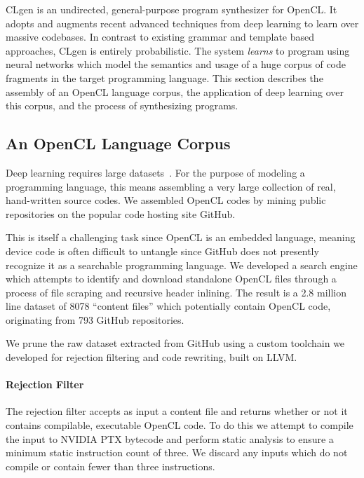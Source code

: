 
CLgen is an undirected, general-purpose program synthesizer for OpenCL. It adopts and augments recent advanced techniques from deep learning to learn over massive codebases. In contrast to existing grammar and template based approaches, CLgen is entirely probabilistic. The system \emph{learns} to program using neural networks which model the semantics and usage of a huge corpus of code fragments in the target programming language. This section describes the assembly of an OpenCL language corpus, the application of deep learning over this corpus, and the process of synthesizing programs.

\subsection{An OpenCL Language Corpus}

Deep learning requires large datasets~\cite{LeCun2015}. For the purpose of modeling a programming language, this means assembling a very large collection of real, hand-written source codes. We assembled OpenCL codes by mining public repositories on the popular code hosting site GitHub.

This is itself a challenging task since OpenCL is an embedded language, meaning device code is often difficult to untangle since GitHub does not presently recognize it as a searchable programming language. We developed a search engine which attempts to identify and download standalone OpenCL files through a process of file scraping and recursive header inlining. The result is a 2.8 million line dataset of 8078 ``content files'' which potentially contain OpenCL code, originating from 793 GitHub repositories.

We prune the raw dataset extracted from GitHub using a custom toolchain we developed for rejection filtering and code rewriting, built on LLVM.

\paragraph{Rejection Filter}\label{sec:rejection-filter} The rejection filter accepts as input a content file and returns whether or not it contains compilable, executable OpenCL code. To do this we attempt to compile the input to NVIDIA PTX bytecode and perform static analysis to ensure a minimum static instruction count of three. We discard any inputs which do not compile or contain fewer than three instructions.

